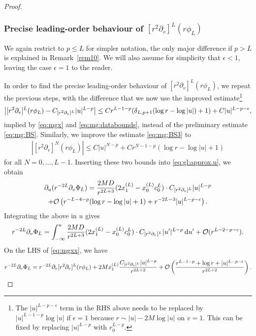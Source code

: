 \documentclass[11pt,english]{article}
\numberwithin{equation}{section}
\theoremstyle{remark}
\theoremstyle{plain}
\theoremstyle{remark}
\newcommand{\dd}{\mathop{}\!\mathrm{d}}
\newcommand{\pu}{\partial_u}
\newcommand{\pv}{\partial_v}
\renewcommand{\(}{\left(}
\renewcommand{\)}{\right)}
\begin{document}
\begin{proof}
\subsubsection{Precise leading-order behaviour of \texorpdfstring{$[r^2\pv]^L(r\phi_L)$}{(r2 d/dv)L(r phi-L)}}
We again restrict to $p\leq L$ for simpler notation, the only major difference if $p>L$ is explained in Remark~\ref{rem10}. 
We will also assume for simplicity that $\epsilon<1$, leaving the case $\epsilon=1$ to the reader.

In order to find the precise leading-order behaviour of $[r^2\pv]^L(r\phi_L)$, we repeat the previous steps, with the difference that we now  use the improved estimate\footnote{\label{footnote}The $|u|^{L-p-\epsilon}$ term in the RHS above needs to be replaced by $|u|^{L-1-p}\log |u|$ if $\epsilon= 1$ because $r\sim |u|-2M\log|u| $ on $v=1$. This can be fixed by replacing $|u|^{L-p}$ with $r_0^{L-p}$.}
\begin{align}
\left|	[r^2\pv]^L(r\phi_L)-\cv{L}|u|^{L-p}	\right|\leq C r^{L-1-p}(\delta_{L,p+1}(\log r-\log |u|)+1)+C|u|^{L-p-\epsilon},
\end{align}
implied by \eqref{eq:mgx} and \eqref{eq:mg:databounds}, instead of the preliminary estimate \eqref{eq:mg:BS}. 
Similarly, we improve the estimate \eqref{eq:mg:BS3} to
\begin{align}
\left| [r^2\pv]^N(r\phi_L)  \right|\leq C |u|^{N-p}+Cr^{N-1-p}(\log r-\log |u|+1)
\end{align} for all $N=0,\dots, L-1$.
Inserting these two bounds into \eqref{eq:gl:approx.u}, we obtain
\begin{multline}
\pu(r^{-2L}\pv\Phi_L)
=\frac{2MD}{r^{2L+3}}(2x_1^{(L)}-x_0^{(L)}c_0^L)\cdot \cv{L}|u|^{L-p}\\
+\mathcal O\left(r^{-L-4-p}(\log r-\log|u|+1)+r^{-2L-3}|u|^{L-p-\epsilon}\right).
\end{multline}
Integrating the above in $u$ gives
\begin{align}\label{eq:mgxx}
r^{-2L}\pv\Phi_L=\int_{-\infty}^u \frac{2MD}{r^{2L+3}}(2x_1^{(L)}-x_0^{(L)}c_0^L)\cdot \cv{L}|u'|^{L-p}\dd u'+\mathcal O(r^{L-2-p-\epsilon}).
\end{align}
On the LHS of \eqref{eq:mgxx}, we have
\begin{align}\label{eq:mg:LHS}
r^{-2L}\pv\Phi_L=r^{-2L}\pv[r^2\pv]^L(r\phi_L)
+2Mx_1^{(L)}\frac{\cv{L}|u|^{L-p}}{r^{2L+2}}+\mathcal O\left(\frac{r^{L-1-p}+\log r +|u|^{L-p-\epsilon}}{r^{2L+2}}\right).

\end{align}
\end{proof}
\end{document}
